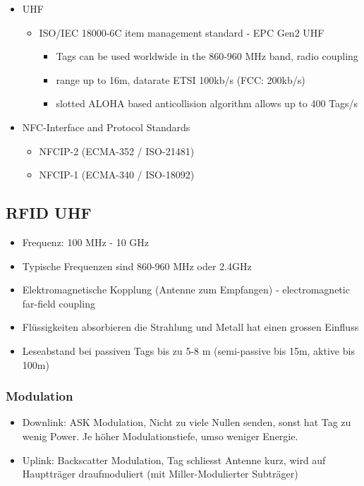 \begin{itemize}
\begin{itemize}
			\end{itemize}
		\item UHF
			\begin{itemize}
				\item ISO/IEC 18000-6C item management standard - EPC Gen2 UHF
					\begin{itemize}
						\item Tags can be used worldwide in the 860-960 MHz band, radio coupling
						\item range up to 16m, datarate ETSI 100kb/s (FCC: 200kb/s)
						\item slotted ALOHA based anticollision algorithm allows up to 400 Tags/s
					\end{itemize}
			\end{itemize}
		\item NFC-Interface and Protocol Standards
			\begin{itemize}
				\item NFCIP-2 (ECMA-352 / ISO-21481) 
				\item NFCIP-1 (ECMA-340 / ISO-18092) 
			\end{itemize}
	\end{itemize}
\subsection{RFID UHF}
	\begin{itemize}
		\item Frequenz:	100 MHz - 10 GHz
		\item Typische Frequenzen sind 860-960 MHz oder 2.4GHz
		\item Elektromagnetische Kopplung (Antenne zum Empfangen) - electromagnetic far-field coupling
		\item Flüssigkeiten absorbieren die Strahlung und Metall hat einen grossen Einfluss
		\item Leseabstand bei passiven Tags bis zu 5-8 m (semi-passive bis 15m, aktive bis 100m)
		
	\end{itemize}

\subsubsection{Modulation}
	\begin{itemize}
		\item Downlink: ASK Modulation, Nicht zu viele Nullen senden, sonst hat Tag zu wenig Power. Je höher Modulationstiefe, umso weniger Energie. 
		\item Uplink: Backscatter Modulation, Tag schliesst Antenne kurz, wird auf Hauptträger draufmoduliert (mit Miller-Modulierter Subträger)
	\end{itemize}
	
